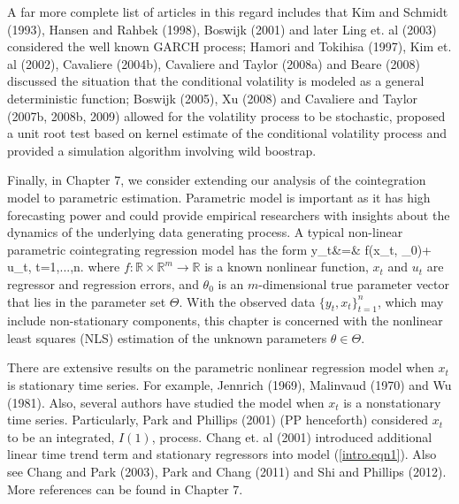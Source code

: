 A far more complete list of articles in this regard includes that Kim and Schmidt (1993), Hansen and Rahbek (1998),  Boswijk (2001) and later Ling et. al (2003) considered   the well known GARCH process; Hamori and Tokihisa (1997),  Kim et. al (2002),  Cavaliere (2004b), Cavaliere and Taylor (2008a) and Beare (2008) discussed  the situation that the conditional volatility is modeled as a general deterministic function; Boswijk (2005),  Xu (2008) and  Cavaliere and Taylor (2007b, 2008b, 2009) allowed for the volatility process to be stochastic, proposed a unit root test based on kernel estimate of the conditional volatility process and provided a simulation algorithm involving wild boostrap.


Finally, in Chapter 7, we consider extending our analysis of the cointegration model to parametric estimation. Parametric model is important as it has high forecasting power and could provide empirical researchers with insights about the dynamics of the underlying data generating process. A typical non-linear parametric cointegrating regression model has the form
 \be y_t&=&
f(x_t, \theta_0)+\,  u_t, \quad t=1,...,n.
\ee
where  $f:\mathbb{R} \times \mathbb{R}^m \rightarrow \mathbb{R}$ is a known nonlinear function,
$x_t$ and  $u_t$ are regressor and regression errors, and   $\theta_0$ is an $m$-dimensional true parameter vector that lies in the parameter set $\Theta$. With the observed data $\{y_t, x_t\}_{t=1}^n$, which may include non-stationary components, this chapter is concerned with the nonlinear least squares (NLS) estimation of the unknown parameters $\theta\in \Theta$.

 There are extensive results on the parametric nonlinear regression model when $x_t$ is stationary time series. For example, Jennrich (1969), Malinvaud (1970) and Wu (1981). Also, several authors have studied the model when $x_t$ is a nonstationary time series. Particularly, Park and Phillips (2001) (PP henceforth) considered $x_t$ to be an integrated, $I(1)$, process. Chang et. al (2001) introduced additional linear time trend term and stationary regressors into model (\ref{intro.eqn1}). Also see Chang and Park (2003), Park and Chang (2011) and Shi and Phillips (2012). More references can be found in Chapter 7.

